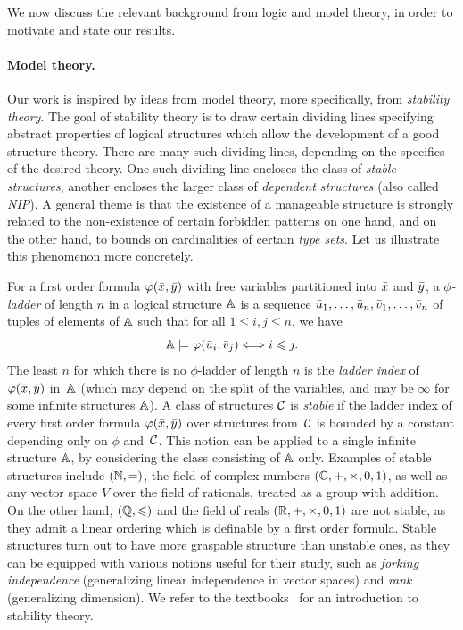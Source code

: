 We now discuss the relevant background from logic and model theory, in order to motivate and state our results.



\paragraph{Model theory.}Our work is inspired by ideas from model theory,  more specifically, from \emph{stability theory}.
  The goal of {stability theory}
  is to draw certain dividing lines
  specifying abstract properties of 
  logical structures which allow the development 
  of a good structure theory. There are many such dividing lines, depending on the specifics of the desired theory. One such dividing line encloses the class of \emph{stable structures}, 
  another encloses the larger class of \emph{dependent structures} (also called \emph{NIP}). 
  A general theme is that the existence of a manageable structure is strongly related to
  the non-existence of certain forbidden patterns on one hand,
and on the other hand, to bounds on cardinalities
of certain \emph{type sets}.  
  Let us illustrate this phenomenon more concretely.

For a first order formula 
$\varphi(\bar{x},\bar{y})$ 
 with free variables
partitioned into  $\bar{x}$ and $\bar{y}$,
a \emph{$\phi$-ladder}
of length $n$ in a logical structure $\mathbb A$ is a sequence $\bar{u}_1,\ldots, \bar{u}_{n},
\bar{v}_1,\ldots, \bar{v}_{n}$ of tuples of elements of $\mathbb A$ 
such that for all $1\leq i,j\le n$, we have
$$\mathbb{A}\models\varphi(\bar{u}_i,\bar{v}_j)\Longleftrightarrow i\leqslant j.$$
The least  $n$ for which 
there is no $\phi$-ladder of length $n$ is 
the \emph{ladder index} 
of $\varphi(\bar{x},\bar{y})$ in~$\mathbb A$ (which may depend on the split of the
variables, and may be $\infty$ for some infinite structures $\mathbb A$). A class of structures $\mathcal{C}$ is \emph{stable} if
the ladder index of every first order formula $\varphi(\bar{x},\bar{y})$ over
structures from~$\mathcal{C}$ is bounded by a constant depending only on $\phi$ 
and~$\mathcal{C}$. This notion can be applied to a single infinite structure $\mathbb A$, by considering the class consisting of $\mathbb A$ only.
Examples of stable structures include $(\mathbb N,=)$,
the field of complex numbers $(\mathbb C,+,\times,0,1)$,
as well as any vector space $V$ over the field of rationals, treated as a group with addition. On the other hand, $(\mathbb Q,\leqslant)$ and the field of reals $(\mathbb R,+,\times,0,1)$ are not stable,
as they admit a linear ordering which is definable by a first order formula.
Stable structures turn out to have more graspable  structure than unstable ones, as they can be equipped with various notions 
useful for their study, such as
\emph{forking independence} (generalizing linear independence in vector spaces)
and \emph{rank} (generalizing dimension).
We refer to the textbooks~\cite{} for an introduction to stability theory.


